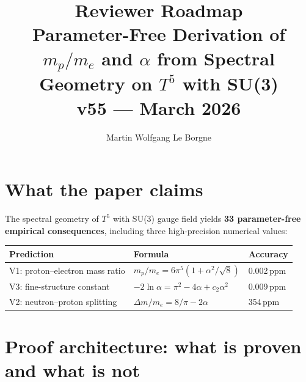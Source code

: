 \documentclass[11pt,a4paper]{article}
\title{\vspace{-2em}\textbf{Reviewer Roadmap}\\[0.3em]
\large Parameter-Free Derivation of $m_p/m_e$ and $\alpha$ from Spectral Geometry on $T^5$ with SU(3)\\[0.2em]
\normalsize v55 --- March 2026}
\author{Martin Wolfgang Le Borgne}
\date{}
\begin{document}
\maketitle\thispagestyle{fancy}\vspace{-2em}

\section*{What the paper claims}

The spectral geometry of
$T^5$ with SU(3) gauge field yields \textbf{33 parameter-free empirical consequences},
including three high-precision numerical values:
\begin{center}
\renewcommand{\arraystretch}{1.1}
\begin{tabular}{lll}
\toprule
\textbf{Prediction} & \textbf{Formula} & \textbf{Accuracy}\\
\midrule
V1: proton--electron mass ratio & $m_p/m_e = 6\pi^5(1+\alpha^2/\!\sqrt{8})$ & 0.002\,ppm\\
V3: fine-structure constant & $-2\ln\alpha = \pi^2-4\alpha+c_2\alpha^2$ & 0.009\,ppm\\
V2: neutron--proton splitting & $\Delta m/m_e = 8/\pi-2\alpha$ & 354\,ppm\\
\bottomrule
\end{tabular}
\end{center}

\section*{Proof architecture: what is proven and what is not}
\end{document}
